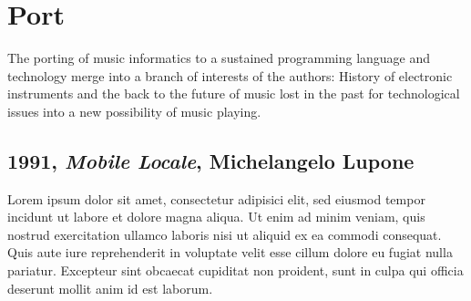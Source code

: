 \documentclass[twoside,a4paper]{article}
\begin{document}

\section{Port}
\label{sec:porting}

The porting of music informatics to a sustained programming language and technology merge into a branch of interests of the authors: History of electronic instruments and the back to the future of music lost in the past for technological issues into a new possibility of music playing. 


\subsection{1991, \emph{Mobile Locale}, Michelangelo Lupone}

Lorem ipsum dolor sit amet, consectetur adipisici elit, sed eiusmod tempor
incidunt ut labore et dolore magna aliqua. Ut enim ad minim veniam, quis
nostrud exercitation ullamco laboris nisi ut aliquid ex ea commodi consequat.
Quis aute iure reprehenderit in voluptate velit esse cillum dolore eu fugiat
nulla pariatur. Excepteur sint obcaecat cupiditat non proident, sunt in culpa
qui officia deserunt mollit anim id est laborum.
\end{document}
